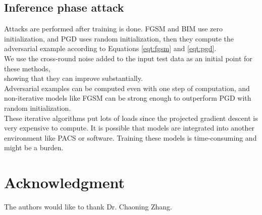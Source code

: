 \subsection{Inference phase attack}
Attacks are performed after training is done. FGSM and BIM use zero initialization, and PGD uses random initialization, then they compute the adversarial example according to Equations \ref{eqt:fgsm} and \ref{eqt:pgd}.\\
We use the cross-round noise added to the input test data as an initial point for these methods, \\



showing that they can improve substantially.\\ Adversarial examples can be computed even with one step of computation, and non-iterative models like FGSM can be strong enough to outperform PGD with random initialization.\\
These iterative algorithms put lots of loads since the projected gradient descent is very expensive to compute. \cite{shafahi2019adversarial}
It is possible that models are integrated into another environment like PACS or software. Training these models is time-consuming and might be a burden.











\section*{Acknowledgment}


The authors would like to thank Dr. Chaoning Zhang.


\ifCLASSOPTIONcaptionsoff
  \newpage
\fi






% 
% 

% 
% 
% 

